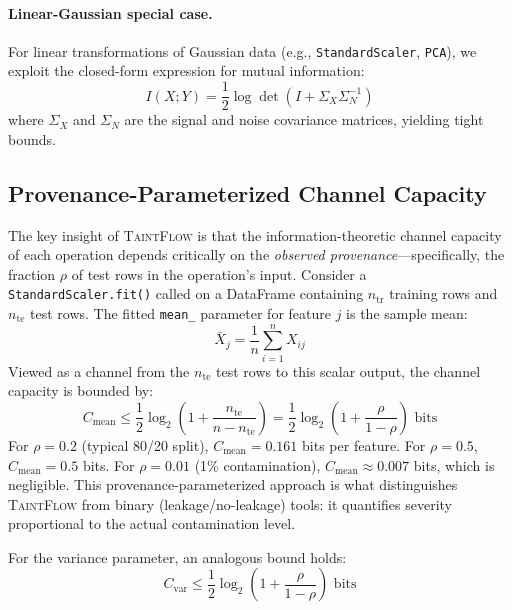 \documentclass[11pt]{article}
\begin{document}
\paragraph{Linear-Gaussian special case.}
For linear transformations of Gaussian data (e.g.,
\texttt{StandardScaler}, \texttt{PCA}), we exploit the closed-form
expression for mutual information:
\begin{equation}\label{eq:gaussian}
  I(X;Y) = \frac{1}{2}\log\det\!\left(I + \Sigma_{X}\Sigma_{N}^{-1}\right)
\end{equation}
where $\Sigma_X$ and $\Sigma_N$ are the signal and noise covariance
matrices, yielding tight bounds.

\subsection{Provenance-Parameterized Channel Capacity}

The key insight of \textsc{TaintFlow} is that the information-theoretic
channel capacity of each operation depends critically on the
\emph{observed provenance}---specifically, the fraction $\rho$ of test
rows in the operation's input.  Consider a \texttt{StandardScaler.fit()}
called on a DataFrame containing $n_{\text{tr}}$ training rows and
$n_{\text{te}}$ test rows.  The fitted \texttt{mean\_} parameter for
feature $j$ is the sample mean:
\begin{equation}
\bar{X}_j = \frac{1}{n}\sum_{i=1}^{n} X_{ij}
\end{equation}
Viewed as a channel from the $n_{\text{te}}$ test rows to this scalar
output, the channel capacity is bounded by:
\begin{equation}\label{eq:cmean}
C_{\text{mean}} \leq \frac{1}{2}\log_2\left(1 + \frac{n_{\text{te}}}{n - n_{\text{te}}}\right) = \frac{1}{2}\log_2\left(1 + \frac{\rho}{1 - \rho}\right) \text{ bits}
\end{equation}
For $\rho = 0.2$ (typical 80/20 split), $C_{\text{mean}} = 0.161$ bits
per feature.  For $\rho = 0.5$, $C_{\text{mean}} = 0.5$ bits.  For
$\rho = 0.01$ (1\% contamination), $C_{\text{mean}} \approx 0.007$ bits,
which is negligible.  This provenance-parameterized approach is what
distinguishes \textsc{TaintFlow} from binary (leakage/no-leakage) tools:
it quantifies severity proportional to the actual contamination level.

For the variance parameter, an analogous bound holds:
\begin{equation}
C_{\text{var}} \leq \frac{1}{2}\log_2\left(1 + \frac{\rho}{1 - \rho}\right) \text{ bits}
\end{equation}
\end{document}
